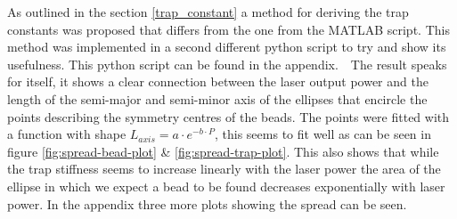 As outlined in the section \ref{trap_constant} a method for deriving the trap constants was proposed that differs from the one from the MATLAB script. This method was implemented in a second different python script to try and show its usefulness. This python script can be found in the appendix.\
\
 The result speaks for itself, it shows a clear connection between the laser output power and the length of the semi-major and semi-minor axis of the ellipses that encircle the points describing the symmetry centres of the beads. The points were fitted with a function with shape $L_{axis}=a\cdot e^{-b\cdot P}$, this seems to fit well as can be seen in figure \ref{fig:spread-bead-plot} \& \ref{fig:spread-trap-plot}. This also shows that while the trap stiffness seems to increase linearly with the laser power the area of the ellipse in which we expect a bead to be found decreases exponentially with laser power. In the appendix three more plots showing the spread can be seen.

